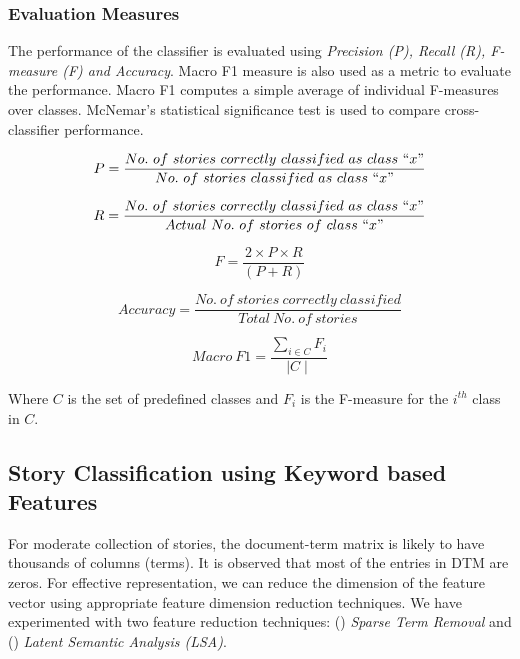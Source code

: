 \documentclass[times, 11pt, a4paper]{article}
\begin{document}
\subsubsection{Evaluation Measures} \label{Evaluation} 

The performance of the classifier is evaluated using \textit{Precision (P), Recall (R), F-measure (F) and Accuracy}. Macro F1 measure is also used as a metric to evaluate the performance. Macro F1 computes a simple average of individual F-measures over classes. McNemar's statistical significance test is used to compare cross-classifier performance. 


\begin{equation*}
P = \frac{No.\ of\ stories\ correctly\ classified\ as\ class\ ``x"}{No.\ of\ stories\ classified\ as\ class\ ``x"} 
\end{equation*}

\begin{equation*}
R = \frac{No.\ of\ stories\ correctly\ classified\ as\ class\ ``x"}{Actual\ No.\ of\ stories\ of\ class\ ``x"} 
\end{equation*}

\begin{equation*}
F = \frac{2\times P\times R}{(P +R)} 
\end{equation*}

\begin{equation*}
Accuracy = \frac{No.\ of\ stories\ correctly\ classified}{Total\ No.\ of\ stories}
\end{equation*}


\begin{equation*}
Macro\ F1 = \frac{\displaystyle\sum_{i \in C} F_i}{\mid C \mid}
\end{equation*}

Where $C$ is the set of predefined classes and $F_i$ is the F-measure for the $i^{th}$ class in $C$. 



\subsection{Story Classification using Keyword based Features} \label{Story Classification using Keyword Features}

For moderate collection of stories, the document-term matrix is likely to have thousands of columns (terms). It is observed that most of the entries in DTM are zeros. For effective representation, we can reduce the dimension of the feature vector using appropriate feature dimension reduction techniques. We have experimented with two feature reduction techniques: () \textit{Sparse Term Removal} and () \textit{Latent Semantic Analysis (LSA)}.
	
\end{document}
